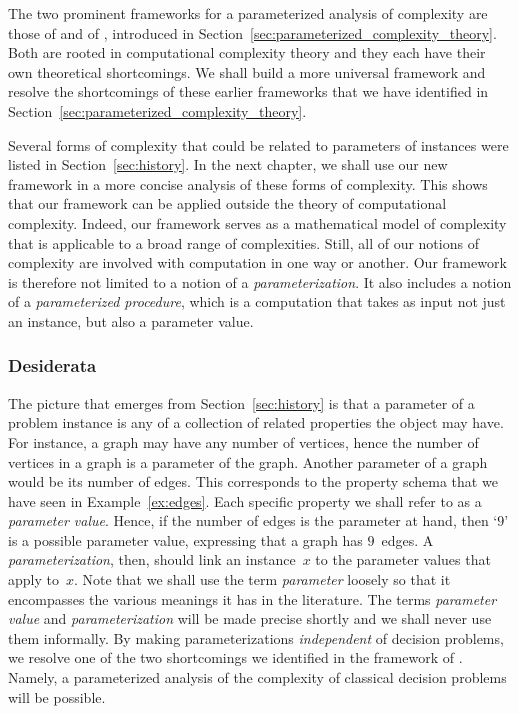 \label{sec:framework}%

The two prominent frameworks for a parameterized analysis of complexity are those of \citeauthor{downey1999parameterized} and of \citeauthor{flum2006parameterized}, introduced in Section~\ref{sec:parameterized_complexity_theory}.
Both are rooted in computational complexity theory and they each have their own theoretical shortcomings.
We shall build a more universal framework and resolve the shortcomings of these earlier frameworks that we have identified in Section~\ref{sec:parameterized_complexity_theory}.

Several forms of complexity that could be related to parameters of instances were listed in Section~\ref{sec:history}.
In the next chapter, we shall use our new framework in a more concise analysis of these forms of complexity.
This shows that our framework can be applied outside the theory of computational complexity.
Indeed, our framework serves as a mathematical model of complexity that is applicable to a broad range of complexities.
Still, all of our notions of complexity are involved with computation in one way or another.
Our framework is therefore not limited to a notion of a \emph{parameterization}.
It also includes a notion of a \emph{parameterized procedure}, which is a computation that takes as input not just an instance, but also a parameter value.

\subsubsection{Desiderata}
The picture that emerges from Section~\ref{sec:history} is that a parameter of a problem instance is any of a collection of related properties the object may have.
For instance, a graph may have any number of vertices, hence the number of vertices in a graph is a parameter of the graph.
Another parameter of a graph would be its number of edges.
This corresponds to the property schema that we have seen in Example~\ref{ex:edges}.
Each specific property we shall refer to as a \emph{parameter value}.
Hence, if the number of edges is the parameter at hand, then `$9$' is a possible parameter value, expressing that a graph has $9$~edges.
A \emph{parameterization}, then, should link an instance~$x$ to the parameter values that apply to~$x$.
Note that we shall use the term \emph{parameter} loosely so that it encompasses the various meanings it has in the literature.
The terms \emph{parameter value} and \emph{parameterization} will be made precise shortly and we shall never use them informally.
By making parameterizations \emph{independent} of decision problems, we resolve one of the two shortcomings we identified in the framework of \citeauthor{downey1999parameterized}.
Namely, a parameterized analysis of the complexity of classical decision problems will be possible.

